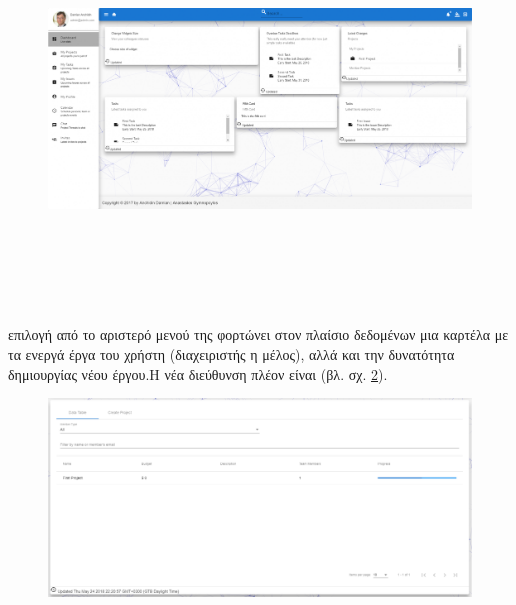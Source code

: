 \begin{figure}[!htb]
\includegraphics[width=\columnwidth, height=10cm]{images/userDashboard.png}
\caption{}
\label{fig:userDashboard}
\end{figure}

\subsubsection*{}
 επιλογή  από το αριστερό μενού της  φορτώνει στον πλαίσιο δεδομένων μια καρτέλα με τα ενεργά έργα του χρήστη (διαχειριστής η μέλος), αλλά και την δυνατότητα δημιουργίας νέου έργου.Η νέα διεύθυνση πλέον είναι  (βλ. σχ. \ref{fig:userMyProjects}).

\begin{figure}[!htb]
\includegraphics[width=\columnwidth, scale=4]{images/userMyProjects.png}
\caption{}
\label{fig:userMyProjects}
\end{figure}

